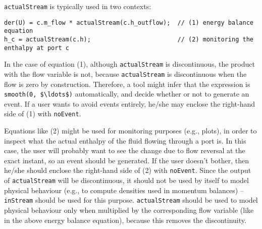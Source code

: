 \begin{nonnormative}
\lstinline!actualStream! is typically used in two contexts:
\begin{lstlisting}[language=modelica]
der(U) = c.m_flow * actualStream(c.h_outflow);  // (1) energy balance equation
h_c = actualStream(c.h);                        // (2) monitoring the enthalpy at port c
\end{lstlisting}
In the case of equation (1), although \lstinline!actualStream! is discontinuous, the product with the flow variable is not, because \lstinline!actualStream! is discontinuous when the flow is zero by construction.
Therefore, a tool might infer that the expression is \lstinline!smooth(0, $\ldots$)! automatically, and decide whether or not to generate an event.
If a user wants to avoid events entirely, he/she may enclose the right-hand side of (1) with \lstinline!noEvent!.

Equations like (2) might be used for monitoring purposes (e.g., plots), in order to inspect what the actual enthalpy of the fluid flowing through a port is.
In this case, the user will probably want to see the change due to flow reversal at the exact instant, so an event should be generated.
If the user doesn't bother, then he/she should enclose the right-hand side of (2) with \lstinline!noEvent!.
Since the output of \lstinline!actualStream! will be discontinuous, it should not be used by itself to model physical behaviour (e.g., to compute densities used in momentum balances) -- \lstinline!inStream! should be used for this purpose.
\lstinline!actualStream! should be used to model physical behaviour only when multiplied by the corresponding flow variable (like in the above energy balance equation), because this removes the discontinuity.
\end{nonnormative}
